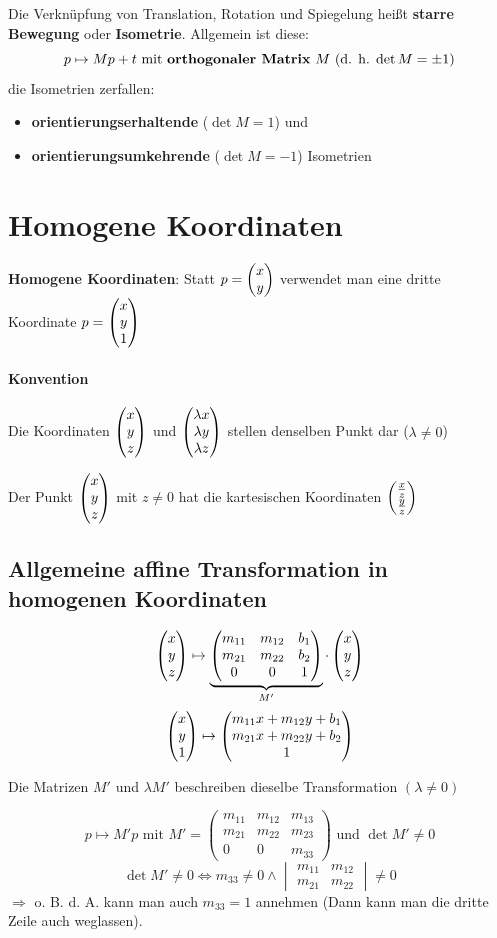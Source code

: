 \Defi Die Verknüpfung von Translation, Rotation und Spiegelung heißt \textbf{starre Bewegung} oder \textbf{Isometrie}.
	Allgemein ist diese:
	\[ p \mapsto Mp + t \text{ mit \textbf{orthogonaler Matrix} $M$ (d. h. $\det M = \pm 1$)}\]
	die Isometrien zerfallen:
	\begin{itemize}
	 \item \textbf{orientierungserhaltende} ($\det M = 1$) und
	 \item \textbf{orientierungsumkehrende} ($\det M = -1$) Isometrien
	\end{itemize}

\section{Homogene Koordinaten}
\Defi \textbf{Homogene Koordinaten}: Statt $p = \begin{pmatrix}x\\y\end{pmatrix}$ verwendet man eine dritte Koordinate
	$p = \begin{pmatrix}x\\y\\1\end{pmatrix}$

\paragraph*{Konvention} Die Koordinaten $\begin{pmatrix}x\\y\\z\end{pmatrix}$ und
	$\begin{pmatrix}\lambda x\\\lambda y\\\lambda z\end{pmatrix}$ stellen denselben Punkt dar ($\lambda \neq 0$)

Der Punkt $\begin{pmatrix}x\\y\\z\end{pmatrix}$ mit $z \neq 0$ hat die kartesischen Koordinaten $\begin{pmatrix}\frac{x}{z}\\\frac{y}{z}\end{pmatrix}$

\subsection{Allgemeine affine Transformation in homogenen Koordinaten}
\[\begin{pmatrix}x\\y\\z\end{pmatrix} \mapsto \underbrace{\begin{pmatrix}
				m_{11} & m_{12} & b_1\\
				m_{21} & m_{22} & b_2\\
				0 & 0 & 1
                           \end{pmatrix}}_{M'} \cdot \begin{pmatrix}x\\y\\z\end{pmatrix}\]
\[\begin{pmatrix}x\\y\\1\end{pmatrix} \mapsto \begin{pmatrix}m_{11}x + m_{12}y + b_1\\m_{21}x + m_{22}y + b_2\\1\end{pmatrix}\]

Die Matrizen $M'$ und $\lambda M'$ beschreiben dieselbe Transformation $(\lambda \neq 0)$

\[p \mapsto M' p \text{ mit } M' = \begin{pmatrix}
                                    m_{11} & m_{12} & m_{13} \\
                                    m_{21} & m_{22} & m_{23} \\
                                    0 & 0 & m_{33}
                                   \end{pmatrix} \text{ und $\det M' \neq 0$}
\]
\[\det M' \neq 0 \Leftrightarrow m_{33} \neq 0 \land \begin{vmatrix}
                                                    m_{11} & m_{12} \\
                                                    m_{21} & m_{22}
                                                   \end{vmatrix} \neq 0
\]
$\Rightarrow$ o. B. d. A. kann man auch $m_{33} = 1$ annehmen (Dann kann man die dritte Zeile auch weglassen).

